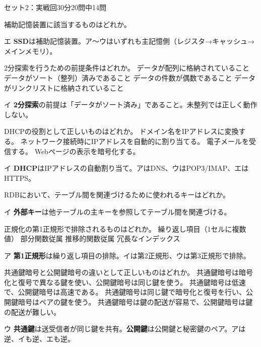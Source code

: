 \begin{mogishi}{セット2：実戦回}{30分}{20問中14問}
\begin{itpmon}[\diffbadge{基}]{補助記憶装置に該当するものはどれか。}
\end{itpmon}
\begin{kaisetsu}{エ}
\textbf{SSD}は補助記憶装置。ア〜ウはいずれも主記憶側（レジスタ→キャッシュ→メインメモリ）。
\end{kaisetsu}

\begin{itpmon}[\diffbadge{標}]{2分探索を行うための前提条件はどれか。}
\sentakushi
  {データが配列に格納されていること}
  {データがソート（整列）済みであること}
  {データの件数が偶数であること}
  {データがリンクリストに格納されていること}
\end{itpmon}
\begin{kaisetsu}{イ}
\textbf{2分探索}の前提は「データがソート済み」であること。未整列では正しく動作しない。
\end{kaisetsu}

\begin{itpmon}[\diffbadge{標}]{DHCPの役割として正しいものはどれか。}
\sentakushi
  {ドメイン名をIPアドレスに変換する。}
  {ネットワーク接続時にIPアドレスを自動的に割り当てる。}
  {電子メールを受信する。}
  {Webページの表示を暗号化する。}
\end{itpmon}
\begin{kaisetsu}{イ}
\textbf{DHCP}はIPアドレスの自動割り当て。アはDNS、ウはPOP3/IMAP、エはHTTPS。
\end{kaisetsu}

\begin{itpmon}[\diffbadge{標}]{RDBにおいて、テーブル間を関連づけるために使われるキーはどれか。}
\end{itpmon}
\begin{kaisetsu}{イ}
\textbf{外部キー}は他テーブルの主キーを参照してテーブル間を関連づける。
\end{kaisetsu}

\begin{itpmon}[\diffbadge{標}]{正規化の第1正規形で排除されるものはどれか。}
\sentakushi
  {繰り返し項目（1セルに複数値）}
  {部分関数従属}
  {推移的関数従属}
  {冗長なインデックス}
\end{itpmon}
\begin{kaisetsu}{ア}
\textbf{第1正規形}は繰り返し項目の排除。イは第2正規形、ウは第3正規形で排除。
\end{kaisetsu}

\begin{itpmon}[\diffbadge{標}]{共通鍵暗号と公開鍵暗号の違いとして正しいものはどれか。}
\sentakushi
  {共通鍵暗号は暗号化と復号で異なる鍵を使い、公開鍵暗号は同じ鍵を使う。}
  {共通鍵暗号は低速で、公開鍵暗号は高速である。}
  {共通鍵暗号は同じ鍵で暗号化と復号を行い、公開鍵暗号はペアの鍵を使う。}
  {共通鍵暗号は鍵の配送が容易で、公開鍵暗号は鍵の配送が難しい。}
\end{itpmon}
\begin{kaisetsu}{ウ}
\textbf{共通鍵}は送受信者が同じ鍵を共有。\textbf{公開鍵}は公開鍵と秘密鍵のペア。アは逆、イも逆、エも逆。
\end{kaisetsu}


\end{mogishi}
